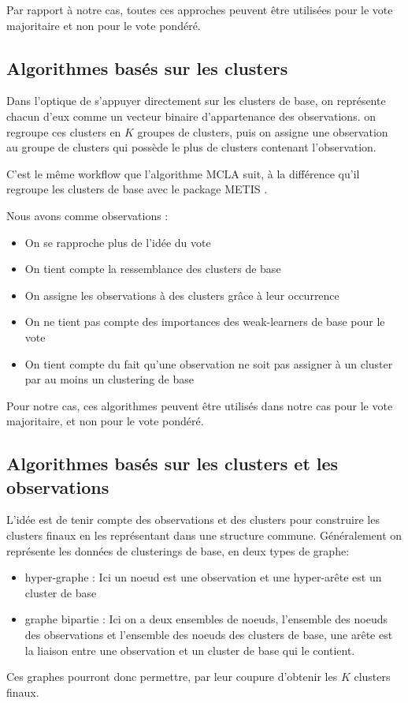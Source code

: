 \documentclass[12pt, french, latin.medieval, a4paper]{report}
\begin{document}
    Par rapport à notre cas, toutes ces approches peuvent être utilisées pour le vote majoritaire et non pour le vote pondéré.
    
    \subsection{Algorithmes basés sur les clusters}
    
    Dans l'optique de s'appuyer directement sur les clusters de base, on représente chacun d'eux comme 
    un vecteur binaire d'appartenance des observations. on regroupe ces clusters en $K$ groupes de clusters, 
    puis on assigne une observation au groupe de clusters qui possède le plus de clusters contenant l'observation.
    
    C'est le même workflow que l'algorithme MCLA \cite{strehl2002cluster} suit, à la différence qu'il regroupe les clusters de base avec le package METIS \cite{karypis1998software} .
    
    Nous avons comme observations :
    \begin{itemize}
        \item On se rapproche plus de l'idée du vote
        \item On tient compte la ressemblance des clusters de base 
        \item On assigne les observations à des clusters grâce à leur occurrence
        \item On ne tient pas compte des importances des weak-learners de base pour le vote
        \item On tient compte du fait qu'une observation ne soit pas assigner à un cluster par au moins un clustering de base
    \end{itemize}

    Pour notre cas, ces algorithmes peuvent être utilisés dans notre cas pour le vote majoritaire, et non pour le vote pondéré.

    \subsection{Algorithmes basés sur les clusters et les observations}
    
    L'idée est de tenir compte des observations et des clusters pour construire les clusters finaux en les représentant dans une structure commune.
    Généralement on représente les données de clusterings de base, en deux types de graphe:

    \begin{itemize}
        \item hyper-graphe :
        Ici un noeud est une observation et une hyper-arête est un cluster de base
        \item graphe bipartie :
        Ici on a deux ensembles de noeuds, l'ensemble des noeuds des observations et l'ensemble des noeuds des clusters de base,
        une arête est la liaison entre une observation et un cluster de base qui le contient.
    \end{itemize}
    Ces graphes pourront donc permettre, par leur coupure d'obtenir les $K$ clusters finaux.
\end{document}
